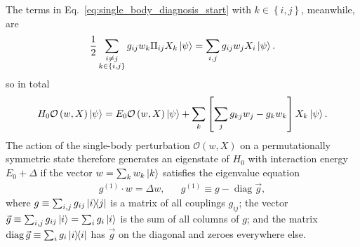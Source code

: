 \documentclass[nofootinbib,twocolumn]{revtex4-2}
\newcommand{\f}[2]{\dfrac{#1}{#2}} %
\newcommand{\p}[1]{\left(#1\right)} %
\renewcommand{\sp}[1]{\left[#1\right]} %
\renewcommand{\set}[1]{\left\{#1\right\}} %
\renewcommand{\c}{\cdot} %
\newcommand{\1}{\mathds{1}}
\renewcommand{\O}{\mathcal{O}}
\DeclareMathOperator{\diag}{diag}
\begin{document}
The terms in Eq.~\eqref{eq:single_body_diagnosis_start} with
$k\in\set{i,j}$, meanwhile, are
\begin{align}
  \f12 \sum_{\substack{i\ne j\\k\in\set{i,j}}}
  g_{ij} w_k \Pi_{ij} X_k \ket\psi
  = \sum_{i,j} g_{ij} w_j X_i \ket\psi.
\end{align}
so in total
\begin{align}
  H_0 \O\p{w,X} \ket\psi
  = E_0 \O\p{w,X} \ket\psi
  + \sum_k \sp{\sum_j g_{kj} w_j - g_k w_k} X_k \ket\psi.
\end{align}
The action of the single-body perturbation $\O\p{w,X}$ on a permutationally symmetric state therefore generates an eigenstate of $H_0$ with interaction energy $E_0+\Delta$ if the vector $w=\sum_k w_k \ket{k}$ satisfies the eigenvalue equation
\begin{align}
  g^{(1)} \c w = \Delta w, && g^{(1)} \equiv g - \diag\vec g,
  \label{eq:single_body_eig}
\end{align}
where $g \equiv\sum_{i,j} g_{ij} \op{i}{j}$ is a matrix of all couplings $g_{ij}$; the vector $\vec g \equiv \sum_{i,j} g_{ij} \ket{i} = \sum_i g_i \ket{i}$ is the sum of all columns of $g$; and the matrix $\diag\vec g \equiv \sum_i g_i \op{i}$ has $\vec g$ on the diagonal and zeroes everywhere else.
\end{document}

